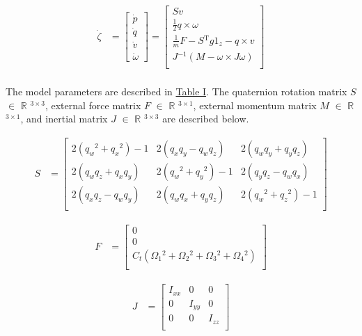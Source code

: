 \documentclass[conference]{IEEEtran}
\begin{document}
\begin{align*}
\dot{\zeta} &= \begin{bmatrix}
	\dot{p} \\
	\dot{q}\\
	\dot{v}\\
	\dot{\omega}
\end{bmatrix} =
\begin{bmatrix}
    Sv \\
    \frac{1}{2}q\times \omega\\
    \frac{1}{m}F - S\mathrm{^{T}}g1_z - q \times v\\ 
    J\mathrm{^{-1}}(M - \omega \times J \omega)\\
\end{bmatrix}\\
\end{align*}
 
The model parameters are described in \hyperref[table1]{Table I}. The quaternion rotation matrix $S$ $\in$ $\mathbb{R}$ $\mathrm{^{3\times3}}$, external force matrix $F$ $\in$ $\mathbb{R}$ $\mathrm{^{3\times1}}$, external momentum matrix $M$ $\in$ $\mathbb{R}$ $\mathrm{^{3\times1}}$, and inertial matrix $J$ $\in$ $\mathbb{R}$ $\mathrm{^{3\times3}}$ are described below.\\
\hfill\break

\begin{align*}
	S &=
	\begin{bmatrix}
		2(q_w \mathrm{^{2}} + q_x \mathrm{^{2}}) - 1 & 
		2(q_x q_y - q_w q_z) & 
		2(q_w q_y + q_y q_z) \\
		2(q_w q_z + q_x q_y) &
		2(q_w \mathrm{^{2}} + q_y \mathrm{^{2}}) - 1 & 
		2(q_y q_z - q_w q_x) \\
		2(q_x q_z - q_w q_y) & 
		2(q_w q_x + q_y q_z) & 
		2(q_w \mathrm{^{2}} + q_z \mathrm{^{2}}) - 1\\
	\end{bmatrix}
\end{align*}
\hfill\break

\begin{align*}
	F &=
	\begin{bmatrix}
		0 \\
		0 \\
		C_t(\Omega_1\mathrm{^{2}} + \Omega_2\mathrm{^{2}} + \Omega_3\mathrm{^{2}} + \Omega_4\mathrm{^{2}})\\ 
	\end{bmatrix}
\end{align*}
\hfill\break

\begin{align*}
	J &=   
	\begin{bmatrix}
		I_{xx} & 0 & 0\\
		0 & I_{yy} & 0\\
		0 & 0 & I_{zz}\\ 
	\end{bmatrix}
\end{align*}
\hfill\break
\end{document}
